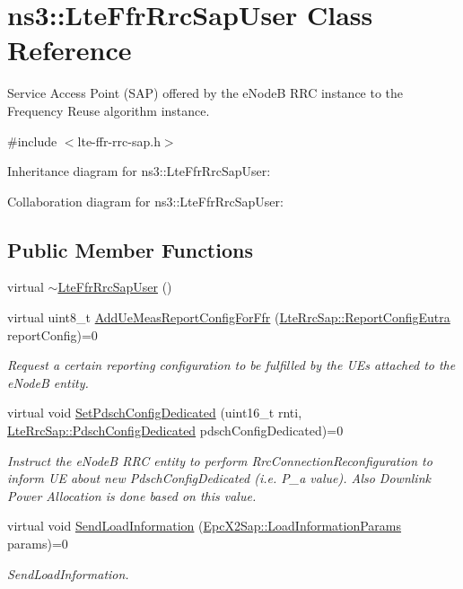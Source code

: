 \hypertarget{classns3_1_1LteFfrRrcSapUser}{}\section{ns3\+:\+:Lte\+Ffr\+Rrc\+Sap\+User Class Reference}
\label{classns3_1_1LteFfrRrcSapUser}


Service Access Point (S\+AP) offered by the e\+NodeB R\+RC instance to the Frequency Reuse algorithm instance.  




{\ttfamily \#include $<$lte-\/ffr-\/rrc-\/sap.\+h$>$}



Inheritance diagram for ns3\+:\+:Lte\+Ffr\+Rrc\+Sap\+User\+:


Collaboration diagram for ns3\+:\+:Lte\+Ffr\+Rrc\+Sap\+User\+:
\subsection*{Public Member Functions}
\begin{DoxyCompactItemize}
\item 
virtual \hyperlink{classns3_1_1LteFfrRrcSapUser_a1d1db73b2a0b052478f02f87bdf0d1a9}{$\sim$\+Lte\+Ffr\+Rrc\+Sap\+User} ()
\item 
virtual uint8\+\_\+t \hyperlink{classns3_1_1LteFfrRrcSapUser_aa08ae169750b394f48a8d345ca9a0e7a}{Add\+Ue\+Meas\+Report\+Config\+For\+Ffr} (\hyperlink{structns3_1_1LteRrcSap_1_1ReportConfigEutra}{Lte\+Rrc\+Sap\+::\+Report\+Config\+Eutra} report\+Config)=0
\begin{DoxyCompactList}\small\item\em Request a certain reporting configuration to be fulfilled by the U\+Es attached to the e\+NodeB entity. \end{DoxyCompactList}\item 
virtual void \hyperlink{classns3_1_1LteFfrRrcSapUser_a9909ef4226b3192d61dd48f31673c314}{Set\+Pdsch\+Config\+Dedicated} (uint16\+\_\+t rnti, \hyperlink{structns3_1_1LteRrcSap_1_1PdschConfigDedicated}{Lte\+Rrc\+Sap\+::\+Pdsch\+Config\+Dedicated} pdsch\+Config\+Dedicated)=0
\begin{DoxyCompactList}\small\item\em Instruct the e\+NodeB R\+RC entity to perform Rrc\+Connection\+Reconfiguration to inform UE about new Pdsch\+Config\+Dedicated (i.\+e. P\+\_\+a value). Also Downlink Power Allocation is done based on this value. \end{DoxyCompactList}\item 
virtual void \hyperlink{classns3_1_1LteFfrRrcSapUser_ace9df928f59a3464e4011474019085de}{Send\+Load\+Information} (\hyperlink{structns3_1_1EpcX2Sap_1_1LoadInformationParams}{Epc\+X2\+Sap\+::\+Load\+Information\+Params} params)=0
\begin{DoxyCompactList}\small\item\em Send\+Load\+Information. \end{DoxyCompactList}\end{DoxyCompactItemize}


